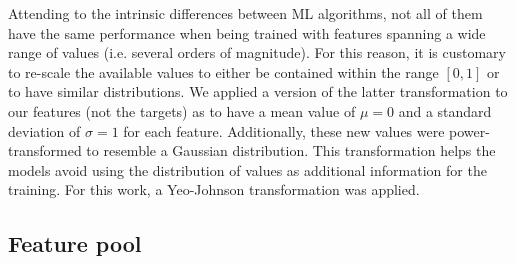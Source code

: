 \documentclass{aa}
\begin{document}
\begin{table}
\setlength{\tabcolsep}{3pt}
\caption{Composition of initial catalogue and number of cross matches with additional surveys and catalogues.}             %
\label{table:composition_catalogue}      %
\centering                          %
\end{table}

Attending to the intrinsic differences between ML algorithms, not all of them have the same performance when being trained with features spanning a wide range of values (i.e. several orders of magnitude). For this reason, it is customary to re-scale the available values to either be contained within the range $[0, 1]$ or to have similar distributions. We applied a version of the latter transformation to our features (not the targets) as to have a mean value of $\mu = 0$ and a standard deviation of $\sigma = 1$ for each feature. Additionally, these new values were power-transformed to resemble a Gaussian distribution. This transformation helps the models avoid using the distribution of values as additional information for the training. For this work, a Yeo-Johnson transformation \citep{10.1093/biomet/87.4.954} was applied.

\subsection{Feature pool}\label{sec:feature_creation}
\end{document}

